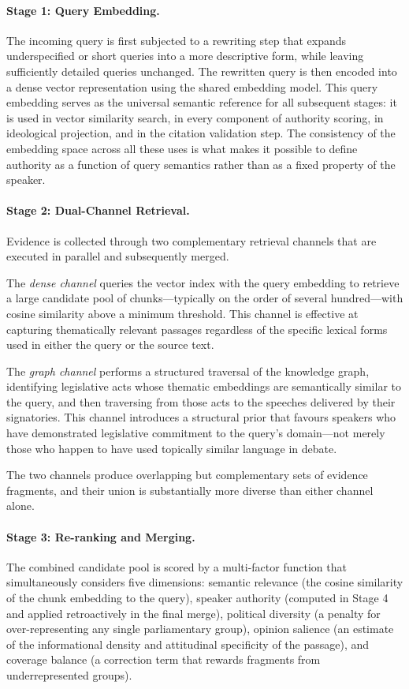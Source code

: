 \paragraph{Stage 1: Query Embedding.}
The incoming query is first subjected to a rewriting step that expands underspecified or
short queries into a more descriptive form, while leaving sufficiently detailed queries
unchanged. The rewritten query is then encoded into a dense vector representation using
the shared embedding model. This query embedding serves as the universal semantic
reference for all subsequent stages: it is used in vector similarity search, in every
component of authority scoring, in ideological projection, and in the citation validation
step. The consistency of the embedding space across all these uses is what makes it
possible to define authority as a function of query semantics rather than as a fixed
property of the speaker.

\paragraph{Stage 2: Dual-Channel Retrieval.}
Evidence is collected through two complementary retrieval channels that are executed in
parallel and subsequently merged.

The \textit{dense channel} queries the vector index with the query embedding to retrieve
a large candidate pool of chunks---typically on the order of several hundred---with cosine
similarity above a minimum threshold. This channel is effective at capturing thematically
relevant passages regardless of the specific lexical forms used in either the query or
the source text.

The \textit{graph channel} performs a structured traversal of the knowledge graph,
identifying legislative acts whose thematic embeddings are semantically similar to the
query, and then traversing from those acts to the speeches delivered by their signatories.
This channel introduces a structural prior that favours speakers who have demonstrated
legislative commitment to the query's domain---not merely those who happen to have used
topically similar language in debate.

The two channels produce overlapping but complementary sets of evidence fragments, and
their union is substantially more diverse than either channel alone.

\paragraph{Stage 3: Re-ranking and Merging.}
The combined candidate pool is scored by a multi-factor function that simultaneously
considers five dimensions: semantic relevance (the cosine similarity of the chunk embedding
to the query), speaker authority (computed in Stage 4 and applied retroactively in the
final merge), political diversity (a penalty for over-representing any single
parliamentary group), opinion salience (an estimate of the informational density and
attitudinal specificity of the passage), and coverage balance (a correction term that
rewards fragments from underrepresented groups).


